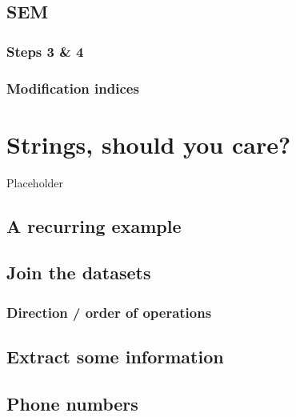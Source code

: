 \documentclass[
]{book}
\begin{document}
\hypertarget{sem}{%
\section{SEM}\label{sem}}

\hypertarget{steps-3-4-1}{%
\subsection{Steps 3 \& 4}\label{steps-3-4-1}}

\hypertarget{modification-indices}{%
\subsection{Modification indices}\label{modification-indices}}

\hypertarget{strings-should-you-care}{%
\chapter{Strings, should you care?}\label{strings-should-you-care}}

Placeholder

\hypertarget{a-recurring-example}{%
\section{A recurring example}\label{a-recurring-example}}

\hypertarget{join-the-datasets}{%
\section{Join the datasets}\label{join-the-datasets}}

\hypertarget{direction-order-of-operations}{%
\subsection{Direction / order of operations}\label{direction-order-of-operations}}

\hypertarget{extract-some-information}{%
\section{Extract some information}\label{extract-some-information}}

\hypertarget{phone-numbers}{%
\section{Phone numbers}\label{phone-numbers}}
\end{document}
